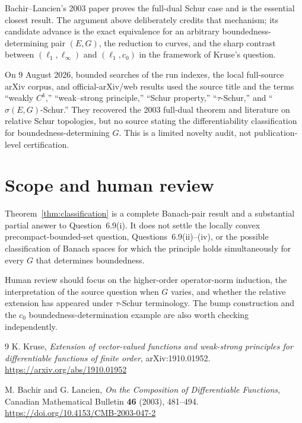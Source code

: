 \documentclass[11pt]{article}
\begin{document}
Bachir--Lancien's 2003 paper \cite{BachirLancien} proves the full-dual Schur
case and is the essential closest result.  The argument above deliberately
credits that mechanism; its candidate advance is the exact equivalence for
an arbitrary boundedness-determining pair $(E,G)$, the reduction to curves,
and the sharp contrast between $(\ell_1,\ell_\infty)$ and
$(\ell_1,c_0)$ in the framework of Kruse's question.

On 9 August 2026, bounded searches of the run indexes, the local full-source
arXiv corpus, and official-arXiv/web results used the source title and the
terms ``weakly $C^k$,'' ``weak--strong principle,'' ``Schur property,''
``$\tau$-Schur,'' and ``$\sigma(E,G)$-Schur.''  They recovered the 2003
full-dual theorem and literature on relative Schur topologies, but no source
stating the differentiability classification for boundedness-determining
$G$.  This is a limited novelty audit, not publication-level certification.

\section{Scope and human review}

Theorem~\ref{thm:classification} is a complete Banach-pair result and a
substantial partial answer to Question~6.9(i).  It does not settle the
locally convex precompact-bounded-set question, Questions~6.9(ii)--(iv), or
the possible classification of Banach spaces for which the principle holds
simultaneously for every $G$ that determines boundedness.

Human review should focus on the higher-order operator-norm induction, the
interpretation of the source question when $G$ varies, and whether the
relative extension has appeared under $\tau$-Schur terminology.  The bump
construction and the $c_0$ boundedness-determination example are also worth
checking independently.

\begin{thebibliography}{9}
K. Kruse,
\emph{Extension of vector-valued functions and weak-strong principles for
differentiable functions of finite order},
arXiv:1910.01952.
\url{https://arxiv.org/abs/1910.01952}

M. Bachir and G. Lancien,
\emph{On the Composition of Differentiable Functions},
Canadian Mathematical Bulletin \textbf{46} (2003), 481--494.
\url{https://doi.org/10.4153/CMB-2003-047-2}
\end{thebibliography}
\end{document}
